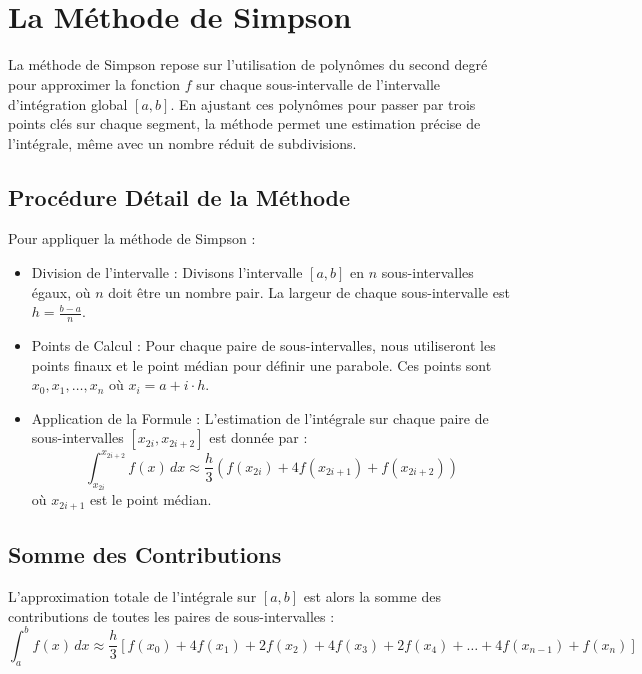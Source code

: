 \documentclass[12pt,a4paper]{article}
\begin{document}
\\
\\
\newpage


\section{La Méthode de Simpson}
La méthode de Simpson repose sur l'utilisation de polynômes du second degré pour approximer la fonction $f$ sur chaque sous-intervalle de l'intervalle d'intégration global $[a,b]$. En ajustant ces polynômes pour passer par trois points clés sur chaque segment, la méthode permet une estimation précise de l'intégrale, même avec un nombre réduit de subdivisions.

\subsection{Procédure Détail de la Méthode}
Pour appliquer la méthode de Simpson :
\begin{itemize}
  \item Division de l'intervalle : Divisons l'intervalle $[a,b]$ en $n$ sous-intervalles égaux, où $n$ doit être un nombre pair. La largeur de chaque sous-intervalle est $h = \frac{b-a}{n}$.
  \item Points de Calcul : Pour chaque paire de sous-intervalles, nous utiliseront les points finaux et le point médian pour définir une parabole. Ces points sont $x_0, x_1, \dots, x_n$ où $x_i = a + i \cdot h$.
  \item Application de la Formule : L'estimation de l'intégrale sur chaque paire de sous-intervalles $[x_{2i}, x_{2i+2}]$ est donnée par :
  \[
  \int_{x_{2i}}^{x_{2i+2}} f(x) \, dx \approx \frac{h}{3} (f(x_{2i}) + 4f(x_{2i+1}) + f(x_{2i+2}))
  \]
  où $x_{2i+1}$ est le point médian.
\end{itemize}

\subsection{Somme des Contributions}
L'approximation totale de l'intégrale sur $[a,b]$ est alors la somme des contributions de toutes les paires de sous-intervalles :
\[
\int_a^b f(x) \, dx \approx \frac{h}{3} [f(x_0) + 4f(x_1) + 2f(x_2) + 4f(x_3) + 2f(x_4) + \dots + 4f(x_{n-1}) + f(x_n)]
\]
\end{document}
